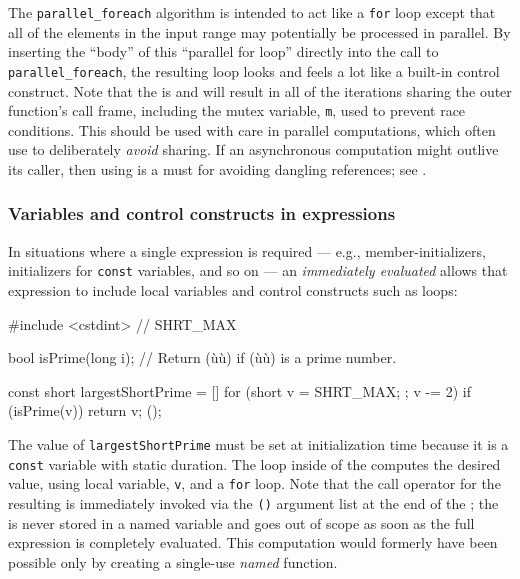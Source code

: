 The \lstinline!parallel_foreach! algorithm is intended to act like a
\lstinline!for! loop except that all of the elements in the input range may
potentially be processed in parallel. By inserting the ``body'' of this
``parallel for loop'' directly into the call to
\lstinline!parallel_foreach!, the resulting loop looks and feels a lot
like a built-in control construct. Note that the  is  and will result in all of the
iterations sharing the outer function's call frame, including the mutex
variable, \lstinline!m!, used to prevent race conditions. This
 should be used with care in parallel
computations, which often use  to deliberately
\emph{avoid} sharing. If an asynchronous computation might outlive its
caller, then using  is a must for avoiding
dangling references; see .

\subsubsection[Variables and control constructs in expressions]{Variables and control constructs in expressions}\label{variables-and-control-constructs-in-expressions}

In situations where a single expression is required --- e.g.,
member-initializers, initializers for \lstinline!const! variables, and so
on --- an \emph{immediately evaluated}  allows
that expression to include local variables and control constructs such
as loops:

\begin{emcppslisting}
#include <cstdint>  // SHRT_MAX

bool isPrime(long i);
    // Return (ù{}ù) if (ù{}ù) is a prime number.

const short largestShortPrime = []{
    for (short v = SHRT_MAX; ; v -= 2) {
        if (isPrime(v)) return v;
    }
}();
\end{emcppslisting}
    

The value of \lstinline!largestShortPrime! must be set at initialization
time because it is a \lstinline!const! variable with static duration. The
loop inside of the  computes the desired
value, using local variable, \lstinline!v!, and a \lstinline!for! loop. Note
that the call operator for the resulting  is
immediately invoked via the \lstinline!()! argument list at the end of the
; the  is never stored
in a named variable and goes out of scope as soon as the full expression
is completely evaluated. This computation would formerly have been
possible only by creating a single-use \emph{named} function.

